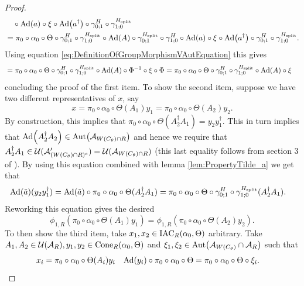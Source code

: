 \documentclass[11pt,a4paper,twoside]{article}
\numberwithin{equation}{section}
\begin{document}
\begin{proof}
\begin{align}
			\nonumber
			&\quad\circ\Ad{a}\circ\xi\circ\Ad{a^\dagger}\circ\gamma^H_{0;1}\circ\gamma^{\Hsplit}_{1;0}\\
			&=\pi_0\circ\alpha_0\circ\Theta\circ\gamma^H_{0;1}\circ\gamma^{\Hsplit}_{1;0}\circ\Ad{A}\circ\gamma^{\Hsplit}_{0;1}\circ\gamma^H_{1;0}\circ\Ad{a}\circ\xi\circ\Ad{a^\dagger}\circ\gamma^H_{0;1}\circ\gamma^{\Hsplit}_{1;0}.
		\end{align}
		Using equation \eqref{eq:DefinitionOfGroupMorphismVAutEquation} this gives
		\begin{align}
			&=\pi_0\circ\alpha_0\circ\Theta\circ\gamma^H_{0;1}\circ\gamma^{\Hsplit}_{1;0}\circ\Ad{A}\circ\Phi^{-1}\circ\xi\circ\Phi=\pi_0\circ\alpha_0\circ\Theta\circ\gamma^H_{0;1}\circ\gamma^{\Hsplit}_{1;0}\circ\Ad{A}\circ\xi
		\end{align}
		concluding the proof of the first item. To show the second item, suppose we have two different representatives of $x$, say
		\begin{equation}
			x=\pi_0\circ\alpha_0\circ\Theta(A_1)y_1=\pi_0\circ\alpha_0\circ\Theta(A_2)y_2.
		\end{equation}
		By construction, this implies that $\pi_0\circ\alpha_0\circ\Theta(A_2^\dagger A_1)=y_2 y_1^\dagger$. This in turn implies that $\Ad{A_2^\dagger A_2}\in\Aut{\AA_{W(C_\theta)\cap R}}$ and hence we require that $A_2^\dagger A_1\in\mathcal U(\mathcal A_{(W(C_\theta)\cap R)^c}')=\mathcal U(\mathcal A_{W(C_\theta)\cap R})$ (this last equality follows from section 3 of \cite{NaScWe_2013}). By using this equation combined with lemma \ref{lem:PropertyTilde_a} we get that
		\begin{align}
			\Ad{\tilde{a}}(y_2y_1^\dagger)&=\Ad{\tilde{a}}\circ\pi_0\circ\alpha_0\circ\Theta(A_2^\dagger A_1)=\pi_0\circ\alpha_0\circ\Theta\circ\gamma^H_{0;1}\circ\gamma^{\Hsplit}_{1;0}(A_2^\dagger A_1).
		\end{align}
		Reworking this equation gives the desired
		\begin{equation}
			\phi_{1,R}(\pi_0\circ\alpha_0\circ\Theta(A_1)y_1)=\phi_{1,R}(\pi_0\circ\alpha_0\circ\Theta(A_2)y_2).
		\end{equation}
		To then show the third item, take $x_1,x_2\in \textrm{IAC}_R(\alpha_0,\Theta)$ arbitrary. Take $A_1,A_2\in\mathcal U(\mathcal A_R),y_1,y_2\in \textrm{Cone}_R(\alpha_0,\Theta)$ and $\xi_1,\xi_2\in\Aut{\AA_{W(C_\theta)}\cap\AA_R}$ such that
		\begin{align}
			x_i&=\pi_0\circ\alpha_0\circ\Theta(A_i)y_i&\Ad{y_i}\circ\pi_0\circ\alpha_0\circ\Theta&=\pi_0\circ\alpha_0\circ\Theta\circ\xi_i.
		\end{align}

\end{proof}
\end{document}
